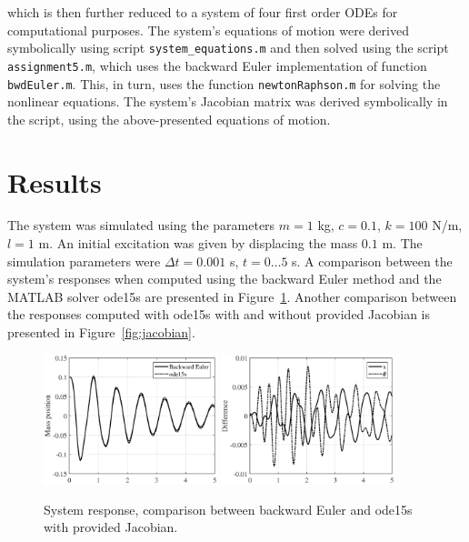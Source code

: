 \documentclass{article}
\begin{document}
	which is then further reduced to a system of four first order ODEs for computational purposes. The system's equations of motion were derived symbolically using script \texttt{system\_equations.m} and then solved using the script \texttt{assignment5.m}, which uses the backward Euler implementation of function \texttt{bwdEuler.m}. This, in turn, uses the function \texttt{newtonRaphson.m} for solving the nonlinear equations. The system's Jacobian matrix was derived symbolically in the script, using the above-presented equations of motion.
	
	\clearpage
	\section*{Results}
	The system was simulated using the parameters $m = 1$ kg, $c = 0.1$, $k = 100$ N/m, $l = 1$ m. An initial excitation was given by displacing the mass $0.1$ m. The simulation parameters were $\Delta t = 0.001$ s, $t = 0 \dots 5$ s. A comparison between the system's responses when computed using the backward Euler method and the MATLAB solver ode15s are presented in Figure~\ref{fig:response}. Another comparison between the responses computed with ode15s with and without provided Jacobian is presented in Figure~\ref{fig:jacobian}.\\
	
	\begin{figure}[h!]
		\centering
		\includegraphics[width=0.45\textwidth]{response.eps}
		\includegraphics[width=0.45\textwidth]{diff_euler.eps}
		\caption{System response, comparison between backward Euler and ode15s with provided Jacobian.\label{fig:response}}
	\end{figure}
\end{document}
